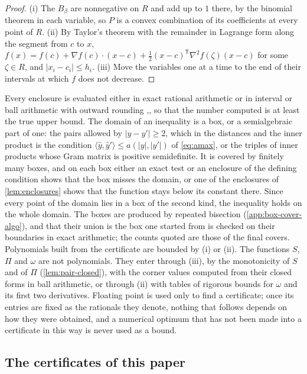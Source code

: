 \documentclass[11pt,reqno]{amsart}
\renewcommand{\_}{\origunderscore\allowbreak}
\numberwithin{equation}{section}
\theoremstyle{plain}
\theoremstyle{definition}
\theoremstyle{remark}
\begin{document}
\begin{proof}
(i) The $B_\beta$ are nonnegative on $R$ and add up to $1$ there, by the
binomial theorem in each variable, so $P$ is a convex combination of its
coefficients at every point of $R$. (ii) By Taylor's theorem with the
remainder in Lagrange form along the segment from $c$ to $x$,
$f(x)=f(c)+\nabla f(c)\cdot(x-c)+\frac12(x-c)^{\mathsf T}\nabla^2f(\zeta)(x-c)$
for some $\zeta\in R$, and $|x_i-c_i|\le h_i$. (iii) Move the variables
one at a time to the end of their intervals at which $f$ does not
decrease.
\end{proof}

Every enclosure is evaluated either in exact rational arithmetic or in
interval or ball arithmetic with outward rounding
\cite[Ch.~5]{MKC09},\cite{Joh17}, so that the number computed is at least
the true upper bound. The domain of an inequality is a box, or a
semialgebraic part of one: the pairs allowed by $|y-y'|\ge2$, which in
the distances and the inner product is the condition
$\langle\hat y,\hat y'\rangle\le a(|y|,|y'|)$ of \eqref{eq:amax}, or the
triples of inner products whose Gram matrix is positive semidefinite. It
is covered by finitely many boxes, and on each box either an exact test or
an enclosure of the defining condition shows that the box misses the
domain, or one of the enclosures of \cref{lem:enclosures} shows that the
function stays below its constant there. Since every point of the domain
lies in a box of the second kind, the inequality holds on the whole
domain. The boxes are produced by repeated bisection
(\cref{app:box-cover-algo}), and that their union is the box one started
from is checked on their boundaries in exact arithmetic; the counts
quoted are those of the final covers. Polynomials built from the
certificate are bounded by (i) or (ii). The functions $S$, $\Pi$ and
$\omega$ are not polynomials. They enter through (iii), by the
monotonicity of $S$ and of $\Pi$ (\cref{lem:pair-closed}), with the
corner values computed from their closed forms in ball arithmetic, or
through (ii) with tables of rigorous bounds for $\omega$ and its first
two derivatives. Floating point is used only to find a certificate; once
its entries are fixed as the rationals they denote, nothing that follows
depends on how they were obtained, and a numerical optimum that has not
been made into a certificate in this way is never used as a bound.

\subsection{The certificates of this paper}\label{sec:kernels-table}
\end{document}

